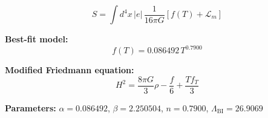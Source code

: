
\begin{equation}
  S = \int d^4x \, |e| \, \frac{1}{16\pi G} \left[ f(T) + \mathcal{L}_m \right]
\end{equation}

\textbf{Best-fit model:}
\begin{equation}
  f(T) = 0.086492 \, T^{0.7900}
\end{equation}

\textbf{Modified Friedmann equation:}
\begin{equation}
  H^2 = \frac{8\pi G}{3} \rho - \frac{f}{6} + \frac{T f_T}{3}
\end{equation}

\textbf{Parameters:}
$\alpha = 0.086492$, \quad
$\beta = 2.250504$, \quad
$n = 0.7900$, \quad
$\Lambda_{\text{BI}} = 26.9069$